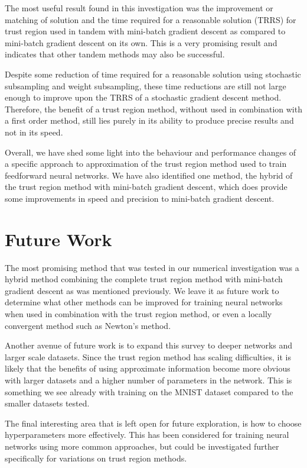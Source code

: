 \documentclass[letterpaper,12pt,titlepage,oneside,final]{book}
\begin{document}
	The most useful result found in this investigation was the improvement or matching of solution and the time required for a reasonable solution (TRRS) for trust region used in tandem with mini-batch gradient descent as compared to mini-batch gradient descent on its own. This is a very promising result and indicates that other tandem methods may also be successful.
	
	 Despite some reduction of time required for a reasonable solution using stochastic subsampling and weight subsampling, these time reductions are still not large enough to improve upon the TRRS of a stochastic gradient descent method. Therefore, the benefit of a trust region method, without used in combination with a first order method, still lies purely in its ability to produce precise results and not in its speed.
	
	Overall, we have shed some light into the behaviour and performance changes of a specific approach to approximation of the trust region method used to train feedforward neural networks. We have also identified one method, the hybrid of the trust region method with mini-batch gradient descent, which does provide some improvements in speed and precision to mini-batch gradient descent.
	

	\section{Future Work}
	
	The most promising method that was tested in our numerical investigation was a hybrid method combining the complete trust region method with mini-batch gradient descent as was mentioned previously. We leave it as future work to determine what other methods can be improved for training neural networks when used in combination with the trust region method, or even a locally convergent method such as Newton's method.
	
	Another avenue of future work is to expand this survey to deeper networks and larger scale datasets. Since the trust region method has scaling difficulties, it is likely that the benefits of using approximate information become more obvious with larger datasets and a higher number of parameters in the network. This is something we see already with training on the MNIST dataset compared to the smaller datasets tested.
	
	The final interesting area that is left open for future exploration, is how to choose hyperparameters more effectively. This has been considered for training neural networks using more common approaches, but could be investigated further specifically for variations on trust region methods. 
	
\end{document}

